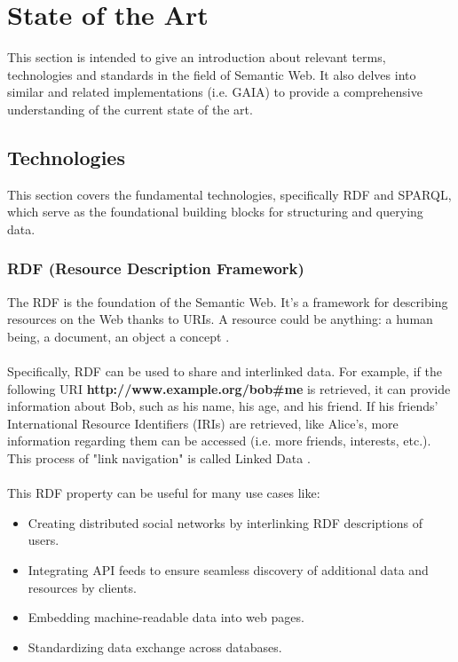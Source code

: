\chapter{State of the Art\label{cha:chapter2}}

This section is intended to give an introduction about relevant terms, technologies and standards in the field of Semantic Web. It also delves into similar and related implementations (i.e. GAIA) to provide a comprehensive understanding of the current state of the art.

\section{Technologies \label{sec:tech}}

This section covers the fundamental technologies, specifically RDF and SPARQL, which serve as the foundational building blocks for structuring and querying data.

\subsection{RDF (Resource Description Framework)\label{sec:rdf_primer}}

The RDF is the foundation of the Semantic Web. It's a framework for describing resources on the Web thanks to URIs. A resource could be anything: a human being, a document, an object a concept \cite{rdf}. 
\\
\\
Specifically, RDF can be used to share and interlinked data. For example, if the following URI \space \textbf{http://www.example.org/bob\#me} is retrieved, it can provide information about Bob, such as his name, his age, and his friend.
If his friends' International Resource Identifiers (IRIs) are retrieved, like Alice's, more information regarding them can be accessed (i.e. more friends, interests, etc.). This process of "link navigation" is called Linked Data \cite{rdf}.
\\
\\
This RDF property can be useful for many use cases like: 
\begin{itemize}
	\item Creating distributed social networks by interlinking RDF descriptions of users.
	\item Integrating API feeds to ensure seamless discovery of additional data and resources by clients.
	\item Embedding machine-readable data into web pages.
	\item Standardizing data exchange across databases.
\end{itemize}

